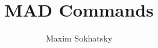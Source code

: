 
\renewcommand{\images}{http://synrc.com/apps/mad/doc/images}

\title{MAD Commands}
\author{Maxim Sokhatsky}



